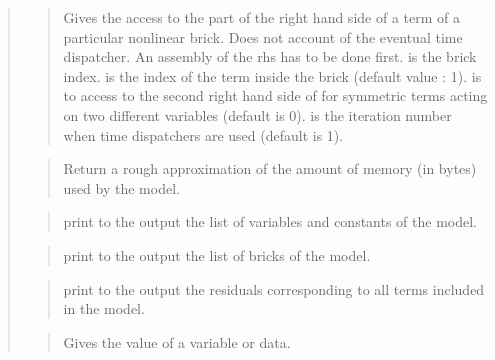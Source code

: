 \documentclass[a4paper,11pt,english]{sphinxmanual}
\begin{document}
\begin{quote}
\begin{quote}
\sphinxAtStartPar
Gives the access to the part of the right hand side of a term
of a particular nonlinear brick. Does not account of the eventual
time dispatcher. An assembly of the rhs has to be done first.
 is the brick index.  is the index of the
term inside the brick (default value : 1).
 is to access to the second right hand side of for symmetric
terms acting on two different variables (default is 0).
 is the iteration number when time dispatchers are
used (default is 1).
\end{quote}

\sphinxAtStartPar
{}
\begin{quote}

\sphinxAtStartPar
Return a rough approximation of the amount of memory (in bytes) used by
the model.
\end{quote}

\sphinxAtStartPar
{}
\begin{quote}

\sphinxAtStartPar
print to the output the list of variables and constants of the model.
\end{quote}

\sphinxAtStartPar
{}
\begin{quote}

\sphinxAtStartPar
print to the output the list of bricks of the model.
\end{quote}

\sphinxAtStartPar
{}
\begin{quote}

\sphinxAtStartPar
print to the output the residuals corresponding to all terms
included in the model.
\end{quote}

\sphinxAtStartPar
{}
\begin{quote}

\sphinxAtStartPar
Gives the value of a variable or data.
\end{quote}


\end{quote}
\end{document}
